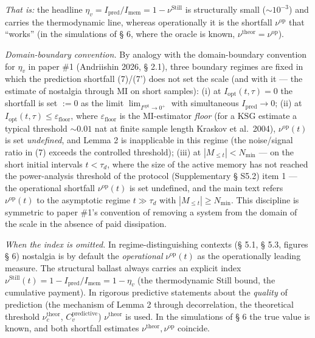 \documentclass[pdflatex,sn-mathphys-ay]{sn-jnl}
\begin{document}
\emph{That is:} the headline \(\eta_v = I_{\text{pred}}/I_{\text{mem}} = 1 - \nu^{\text{Still}}\) is structurally small (\(\sim 10^{-3}\)) and carries the thermodynamic line, whereas operationally it is the shortfall \(\nu^{\text{op}}\) that ``works'' (in the simulations of § 6, where the oracle is known, \(\nu^{\text{theor}} = \nu^{\text{op}}\)).



\emph{Domain-boundary convention.} By analogy with the domain-boundary convention for \(\eta_v\) in paper \#1 (Andriishin 2026, § 2.1), three boundary regimes are fixed in which the prediction shortfall (7)/(7') does not set the scale (and with it --- the estimate of nostalgia through MI on short samples): (i) at \(I_{\text{opt}}(t, \tau) = 0\) the shortfall is set \(:= 0\) as the limit \(\lim_{I^{\text{opt}} \to 0^+}\) with simultaneous \(I_{\text{pred}} \to 0\); (ii) at \(I_{\text{opt}}(t, \tau) \le \varepsilon_{\text{floor}}\), where \(\varepsilon_{\text{floor}}\) is the MI-estimator \emph{floor} (for a KSG estimate a typical threshold \(\sim 0.01\) nat at finite sample length Kraskov et al.~2004), \(\nu^{\text{op}}(t)\) is set \emph{undefined}, and Lemma 2 is inapplicable in this regime (the noise/signal ratio in (7) exceeds the controlled threshold); (iii) at \(|M_{\le t}| < N_{\min}\) --- on the short initial intervals \(t < \tau_d\), where the size of the active memory has not reached the power-analysis threshold of the protocol (Supplementary § S5.2) item 1 --- the operational shortfall \(\nu^{\text{op}}(t)\) is set undefined, and the main text refers \(\nu^{\text{op}}(t)\) to the asymptotic regime \(t \gg \tau_d\) with \(|M_{\le t}| \ge N_{\min}\). This discipline is symmetric to paper \#1's convention of removing a system from the domain of the scale in the absence of paid dissipation.



\emph{When the index is omitted.} In regime-distinguishing contexts (§ 5.1, § 5.3, figures § 6) nostalgia is by default the \emph{operational} \(\nu^{\text{op}}(t)\) as the operationally leading measure. The structural ballast always carries an explicit index \(\nu^{\text{Still}}(t) = 1 - I_{\text{pred}}/I_{\text{mem}} = 1 - \eta_v\) (the thermodynamic Still bound, the cumulative payment). In rigorous predictive statements about the \emph{quality} of prediction (the mechanism of Lemma 2 through decorrelation, the theoretical threshold \(\nu_c^{\text{theor}}\), \(C_v^{\text{predictive}}\)) \(\nu^{\text{theor}}\) is used. In the simulations of § 6 the true value is known, and both shortfall estimates \(\nu^{\text{theor}}, \nu^{\text{op}}\) coincide.
\end{document}
